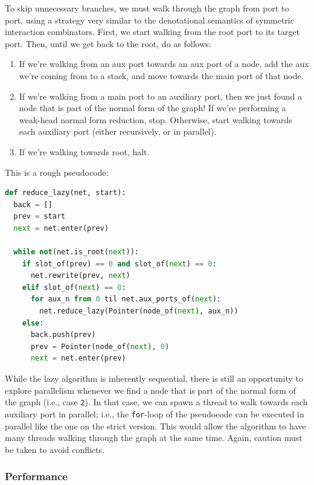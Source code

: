 \documentclass{article}
\theoremstyle{definition}
\theoremstyle{theorem}
\begin{document}
To skip unnecessary branches, we must walk through the graph from  port to port,
using a strategy very similar to the denotational semantics of symmetric
interaction combinators. First, we start walking from the root port to its
target port. Then, until we get back to the root, do as follows:

\begin{enumerate}
  \item If we're walking from an aux port towards an aux port of a node, add the
  aux we're coming from to a stack, and move towards the main port of that node.

  \item If we're walking from a main port to an auxiliary port, then we just
  found a node that is part of the normal form of the graph! If we're performing
  a weak-head normal form reduction, stop. Otherwise, start walking towards each
  auxiliary port (either recursively, or in parallel).

  \item If we're walking towards root, halt.
\end{enumerate}

This is a rough pseudocode:

\begin{lstlisting}[language=Python]
def reduce_lazy(net, start):
  back = []
  prev = start
  next = net.enter(prev)

  while not(net.is_root(next)):
    if slot_of(prev) == 0 and slot_of(next) == 0:
      net.rewrite(prev, next)
    elif slot_of(next) == 0:
      for aux_n from 0 til net.aux_ports_of(next):
        net.reduce_lazy(Pointer(node_of(next), aux_n))
    else:
      back.push(prev)
      prev = Pointer(node_of(next), 0)
      next = net.enter(prev)
\end{lstlisting}

While the lazy algorithm is inherently sequential, there is still an opportunity
to explore parallelism whenever we find a node that is part of the normal form
of the graph (i.e., case \verb|2|). In that case, we can spawn a thread to walk
towards each auxiliary port in parallel; i.e., the \verb|for|-loop of the
pseudocode can be executed in parallel like the one on the strict version. This
would allow the algorithm to have many threads walking through the graph at the
same time.  Again, caution must be taken to avoid conflicts.

\subsubsection{Performance}
\end{document}
